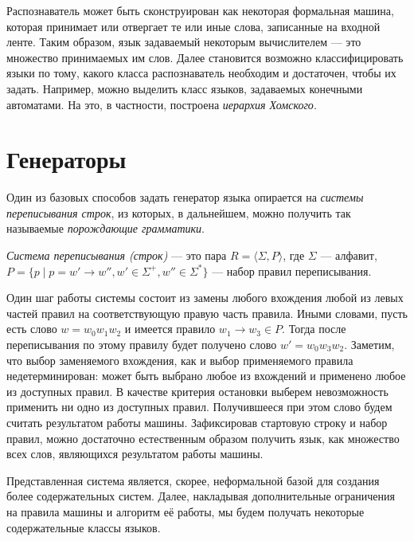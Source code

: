 Распознаватель может быть сконструирован как некоторая формальная машина, которая принимает или отвергает те или иные слова, записанные на входной ленте.
Таким образом, язык задаваемый некоторым вычислителем --- это множество принимаемых им слов.
Далее становится возможно классифицировать языки по тому, какого класса распознаватель необходим и достаточен, чтобы их задать.
Например, можно выделить класс языков, задаваемых конечными автоматами.
На это, в частности, построена \textit{иерархия Хомского}.





\section{Генераторы}

Один из базовых способов задать генератор языка опирается на \textit{системы переписывания строк}, из которых, в дальнейшем, можно получить так называемые \textit{порождающие грамматики}.

\begin{definition}
  \textit{Система переписывания (строк)} --- это пара $R = \langle \Sigma, P  \rangle$, где $\Sigma$ --- алфавит, $P= \{p \mid p = w' \to w'', w' \in \Sigma^+, w'' \in \Sigma^*\}$ --- набор правил переписывания.
\end{definition}

Один шаг работы системы состоит из замены любого вхождения любой из левых частей правил на соответствующую правую часть правила.
Иными словами, пусть есть слово $w = w_0w_1w_2$ и имеется правило $w_1 \to w_3 \in P$.
Тогда после переписывания по этому правилу будет получено слово $w' = w_0w_3w_2$.
Заметим, что выбор заменяемого вхождения, как и выбор применяемого правила недетерминирован: может быть выбрано любое из вхождений и применено любое из доступных правил.
В качестве критерия остановки выберем невозможность применить ни одно из доступных правил.
Получившееся при этом слово будем считать результатом работы машины.
Зафиксировав стартовую строку и набор правил, можно достаточно естественным образом получить язык, как множество всех слов, являющихся результатом работы машины.

Представленная система является, скорее, неформальной базой для создания более содержательных систем.
Далее, накладывая дополнительные ограничения на правила машины и алгоритм её работы, мы будем получать некоторые содержательные классы языков.

